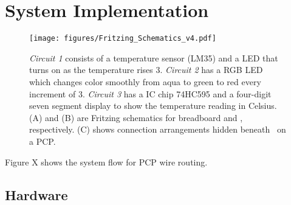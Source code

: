 \section{System Implementation}

\begin{figure*}[t]
 \begin{center}
  \texttt{[image: figures/Fritzing\_Schematics\_v4.pdf]}
  \caption{
    \textit{Circuit 1} consists of a temperature sensor (LM35) and a LED that turns on as the temperature rises 3\textcelsius.
    \textit{Circuit 2} has a RGB LED which changes color smoothly from aqua to green to red every increment of 3\textcelsius.
    \textit{Circuit 3} has a IC chip 74HC595 and a four-digit seven segment display  to show the temperature reading in Celsius.
    (A) and (B) are Fritzing schematics for breadboard and \papertitle, respectively. (C) shows connection arrangements hidden beneath \papertitle\ on a PCP.
  }
  \label{fig:Chosen_Circuits}
  \end{center}
\end{figure*}



Figure X shows the system flow for PCP wire routing.

\subsection{Hardware}


